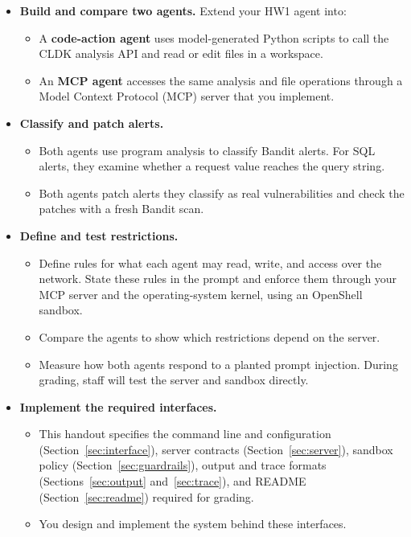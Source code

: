 \documentclass[9pt,letterpaper]{article}
\begin{document}
\begin{itemize}
\item \textbf{Build and compare two agents.} Extend your HW1 agent into:
  \begin{itemize}
  \item A \textbf{code-action agent} uses model-generated Python scripts to call
  the CLDK analysis API and read or edit files in a workspace.
  \item An \textbf{MCP agent} accesses the same analysis and file operations through
  a Model Context Protocol (MCP) server that you implement.
  \end{itemize}

\item \textbf{Classify and patch alerts.}
  \begin{itemize}
  \item Both agents use program analysis to classify Bandit alerts. For SQL
    alerts, they examine whether a request value reaches the query string.
  \item Both agents patch alerts they classify as real vulnerabilities and
    check the patches with a fresh Bandit scan.
  \end{itemize}

\item \textbf{Define and test restrictions.}
  \begin{itemize}
  \item Define rules for what each agent may read, write, and access over the
    network. State these rules in the prompt and enforce them through your MCP
    server and the operating-system kernel, using an OpenShell sandbox.
  \item Compare the agents to show which restrictions depend on the server.
  \item Measure how both agents respond to a planted prompt injection. During
    grading, staff will test the server and sandbox directly.
  \end{itemize}

\item \textbf{Implement the required interfaces.}
  \begin{itemize}
  \item This handout specifies the command line and configuration
    (Section~\ref{sec:interface}), server contracts (Section~\ref{sec:server}),
    sandbox policy (Section~\ref{sec:guardrails}), output and trace formats
    (Sections~\ref{sec:output} and~\ref{sec:trace}), and README
    (Section~\ref{sec:readme}) required for grading.
  \item You design and implement the system behind these interfaces.
  \end{itemize}

\end{itemize}
\end{document}
